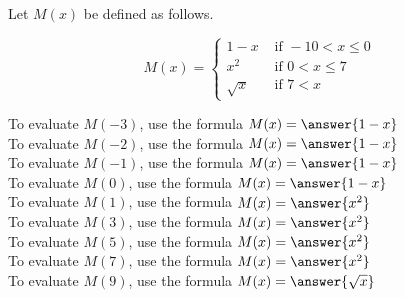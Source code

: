\documentclass{ximera}
\author{Lee Wayand}
\begin{document}
\begin{exercise}




Let $M(x)$ be defined as follows.

\[
M(x) = 
\begin{cases}
  1 - x & \text{ if } -10 < x \leq 0 \\
  x^2 & \text{ if } 0 < x \leq 7 \\
  \sqrt{x} & \text{ if } 7 < x 
\end{cases}
\]



To evaluate $M(-3)$, use the formula $M(x) = \answer{1 - x}$ \\


To evaluate $M(-2)$, use the formula $M(x) = \answer{1 - x}$ \\


To evaluate $M(-1)$, use the formula $M(x) = \answer{1 - x}$ \\


To evaluate $M(0)$, use the formula $M(x) = \answer{1 - x}$ \\


To evaluate $M(1)$, use the formula $M(x) = \answer{x^2}$ \\


To evaluate $M(3)$, use the formula $M(x) = \answer{x^2}$ \\


To evaluate $M(5)$, use the formula $M(x) = \answer{x^2}$ \\


To evaluate $M(7)$, use the formula $M(x) = \answer{x^2}$ \\


To evaluate $M(9)$, use the formula $M(x) = \answer{\sqrt{x}}$ \\


\end{exercise}
\end{document}
